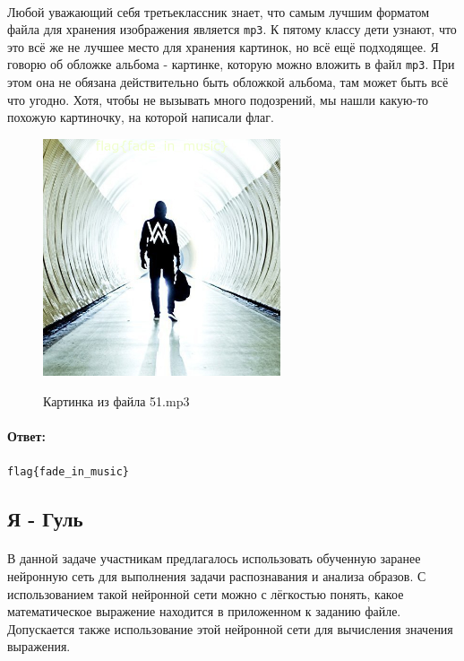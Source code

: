 \documentclass[12pt]{article}
\begin{document}
    \paragraph{}
    Любой уважающий себя третьеклассник знает, что самым лучшим форматом файла для хранения изображения является \verb|mp3|.
    К пятому классу дети узнают, что это всё же не лучшее место для хранения картинок, но всё ещё подходящее.
    Я говорю об обложке альбома - картинке, которую можно вложить в файл \verb|mp3|.
    При этом она не обязана действительно быть обложкой альбома, там может быть всё что угодно.
    Хотя, чтобы не вызывать много подозрений, мы нашли какую-то похожую картиночку, на которой написали флаг.
    \begin{figure}[H]
        \centering
        \includegraphics[width=7cm]{task51}
        \label{fig:task51}
        \caption{Картинка из файла 51.mp3}
    \end{figure}
    \paragraph{Ответ:}
    \verb|flag{fade_in_music}|

    \subsection{Я - Гуль}
    \paragraph{}
    В данной задаче участникам предлагалось использовать обученную заранее нейронную сеть для выполнения задачи распознавания и анализа образов.
    С использованием такой нейронной сети можно с лёгкостью понять, какое математическое выражение находится в приложенном к заданию файле.
    Допускается также использование этой нейронной сети для вычисления значения выражения.
\end{document}

